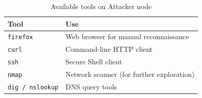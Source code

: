 \documentclass[a4paper, 12pt]{article}
\begin{document}
\begin{table}[H]
\centering
\begin{tabularx}{0.9\textwidth}{lX}
\toprule
\textbf{Tool} & \textbf{Use} \\
\midrule
\texttt{firefox}        & Web browser for manual reconnaissance \\
\texttt{curl}           & Command-line HTTP client \\
\texttt{ssh}            & Secure Shell client \\
\texttt{nmap}           & Network scanner (for further exploration) \\
\texttt{dig / nslookup} & DNS query tools \\
\bottomrule
\end{tabularx}
\caption{Available tools on Attacker node}
\end{table}
\end{document}
